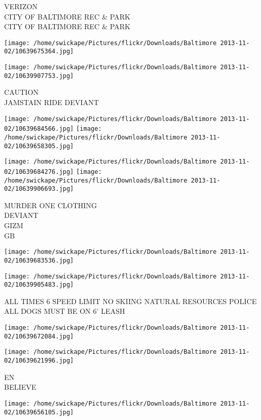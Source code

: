 \documentclass[10pt,letterpaper]{article}
\begin{document}
VERIZON\\
CITY OF BALTIMORE REC \& PARK\\
CITY OF BALTIMORE REC \& PARK
\pagebreak

\texttt{[image: /home/swickape/Pictures/flickr/Downloads/Baltimore 2013-11-02/10639675364.jpg]}

\vspace{0.25in}
\texttt{[image: /home/swickape/Pictures/flickr/Downloads/Baltimore 2013-11-02/10639907753.jpg]}

CAUTION\\
JAMSTAIN RIDE DEVIANT
\pagebreak

\texttt{[image: /home/swickape/Pictures/flickr/Downloads/Baltimore 2013-11-02/10639684566.jpg]}
\texttt{[image: /home/swickape/Pictures/flickr/Downloads/Baltimore 2013-11-02/10639658305.jpg]}

\texttt{[image: /home/swickape/Pictures/flickr/Downloads/Baltimore 2013-11-02/10639684276.jpg]}
\texttt{[image: /home/swickape/Pictures/flickr/Downloads/Baltimore 2013-11-02/10639906693.jpg]}

MURDER ONE CLOTHING\\
DEVIANT\\
GIZM\\
GB
\pagebreak

\texttt{[image: /home/swickape/Pictures/flickr/Downloads/Baltimore 2013-11-02/10639683536.jpg]}

\vspace{0.25in}
\texttt{[image: /home/swickape/Pictures/flickr/Downloads/Baltimore 2013-11-02/10639905483.jpg]}

ALL TIMES 6 SPEED LIMIT NO SKIING NATURAL RESOURCES POLICE\\
ALL DOGS MUST BE ON 6' LEASH
\pagebreak

\texttt{[image: /home/swickape/Pictures/flickr/Downloads/Baltimore 2013-11-02/10639672084.jpg]}

\vspace{0.25in}
\texttt{[image: /home/swickape/Pictures/flickr/Downloads/Baltimore 2013-11-02/10639621996.jpg]}

EN\\
BELIEVE
\pagebreak

\texttt{[image: /home/swickape/Pictures/flickr/Downloads/Baltimore 2013-11-02/10639656105.jpg]}
\end{document}
